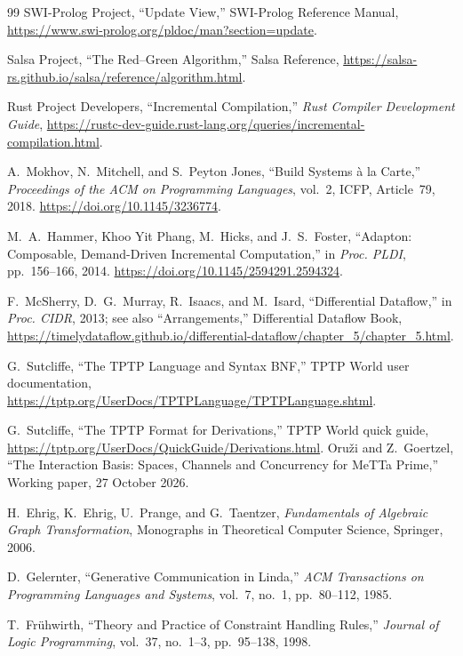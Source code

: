 \documentclass[11pt]{article}
\begin{document}
\begin{thebibliography}{99}
  SWI-Prolog Project,
  ``Update View,'' SWI-Prolog Reference Manual,
  \url{https://www.swi-prolog.org/pldoc/man?section=update}.

  Salsa Project,
  ``The Red--Green Algorithm,'' Salsa Reference,
  \url{https://salsa-rs.github.io/salsa/reference/algorithm.html}.

  Rust Project Developers,
  ``Incremental Compilation,'' \emph{Rust Compiler Development Guide},
  \url{https://rustc-dev-guide.rust-lang.org/queries/incremental-compilation.html}.

  A.~Mokhov, N.~Mitchell, and S.~Peyton Jones,
  ``Build Systems \`a la Carte,''
  \emph{Proceedings of the ACM on Programming Languages}, vol.~2,
  ICFP, Article~79, 2018.  \url{https://doi.org/10.1145/3236774}.

  M.~A.~Hammer, Khoo Yit Phang, M.~Hicks, and J.~S.~Foster,
  ``Adapton: Composable, Demand-Driven Incremental Computation,''
  in \emph{Proc. PLDI}, pp.~156--166, 2014.
  \url{https://doi.org/10.1145/2594291.2594324}.

  F.~McSherry, D.~G.~Murray, R.~Isaacs, and M.~Isard,
  ``Differential Dataflow,'' in \emph{Proc. CIDR}, 2013;
  see also ``Arrangements,'' Differential Dataflow Book,
  \url{https://timelydataflow.github.io/differential-dataflow/chapter_5/chapter_5.html}.

  G.~Sutcliffe,
  ``The TPTP Language and Syntax BNF,''
  TPTP World user documentation,
  \url{https://tptp.org/UserDocs/TPTPLanguage/TPTPLanguage.shtml}.

  G.~Sutcliffe,
  ``The TPTP Format for Derivations,''
  TPTP World quick guide,
  \url{https://tptp.org/UserDocs/QuickGuide/Derivations.html}.
  Oru\v{z}i and Z.~Goertzel,
  ``The Interaction Basis: Spaces, Channels and Concurrency for MeTTa
  Prime,'' Working paper, 27 October 2026.

  H.~Ehrig, K.~Ehrig, U.~Prange, and G.~Taentzer,
  \emph{Fundamentals of Algebraic Graph Transformation},
  Monographs in Theoretical Computer Science, Springer, 2006.

  D.~Gelernter,
  ``Generative Communication in Linda,''
  \emph{ACM Transactions on Programming Languages and Systems}, vol.~7,
  no.~1, pp.~80--112, 1985.

  T.~Fr\"uhwirth,
  ``Theory and Practice of Constraint Handling Rules,''
  \emph{Journal of Logic Programming}, vol.~37, no.~1--3, pp.~95--138, 1998.


\end{thebibliography}
\end{document}
